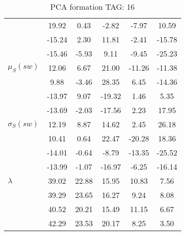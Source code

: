 \begin{table}[h!]
\begin{center}
\begin{tabular}{| l || c | c | c | c | c |}
 & 19.92  & 0.43  & -2.82  & -7.97  & 10.59 \\
 & -15.24  & 2.30  & 11.81  & -2.41  & -15.78 \\
 & -15.46  & -5.93  & 9.11  & -9.45  & -25.23 \\\hline
$\mu_S(sw)$ & 12.06  & 6.67  & 21.00  & -11.26  & -11.38 \\
 & 9.88  & -3.46  & 28.35  & 6.45  & -14.36 \\
 & -13.97  & 9.07  & -19.32  & 1.46  & 5.35 \\
 & -13.69  & -2.03  & -17.56  & 2.23  & 17.95 \\\hline
$\sigma_S(sw)$ & 12.19  & 8.87  & 14.62  & 2.45  & 26.18 \\
 & 10.41  & 0.64  & 22.47  & -20.28  & 18.36 \\
 & -14.01  & -0.64  & -8.79  & -13.35  & -25.52 \\
 & -13.99  & -1.07  & -16.97  & -6.25  & -16.14 \\\hline\hline
$\lambda$ & 39.02  & 22.88  & 15.95  & 10.83  & 7.56 \\
 & 39.29  & 23.65  & 16.27  & 9.24  & 8.08 \\
 & 40.52  & 20.21  & 15.49  & 11.15  & 6.67 \\
 & 42.29  & 23.53  & 20.17  & 8.25  & 3.50 \\\hline
\end{tabular}
\caption{PCA formation TAG: 16}
\end{center}
\end{table}